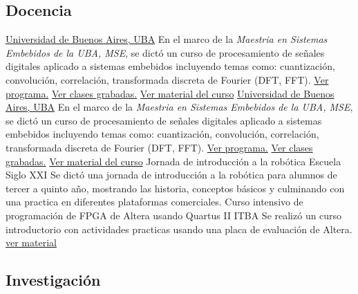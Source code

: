    \subsection{\bfseries{Docencia}}
                   {\href{\linkuba}{Universidad de Buenos Aires, UBA}} {}{}{En el marco de la \emph{Maestria en Sistemas Embebidos de la UBA, MSE}, se dictó un curso de procesamiento de señales digitales  aplicado a sistemas embebidos incluyendo temas como: cuantización, convolución, correlación, transformada discreta de Fourier (DFT, FFT). \href{\linkmse}{Ver programa.} \href{\linkmsepsftwentyonevideos}{Ver clases grabadas.} \href{\linkmsepsftwentyonematerial}{Ver material del curso}}
                                  {\href{\linkuba}{Universidad de Buenos Aires, UBA}} {}{}{En el marco de la \emph{Maestria en Sistemas Embebidos de la UBA, MSE}, se dictó un curso de procesamiento de señales digitales  aplicado a sistemas embebidos incluyendo temas como: cuantización, convolución, correlación, transformada discreta de Fourier (DFT, FFT). \href{\linkmse}{Ver programa.} \href{\linkmsepsfvideos}{Ver clases grabadas.} \href{\linkmsepsfmaterial}{Ver material del curso}}
       { Jornada de introducción a la robótica}                               { Escuela Siglo XXI} {} {} { Se dictó una jornada de introducción a la robótica para alumnos de tercer a quinto año, mostrando las historia, conceptos básicos y culminando con una practica en diferentes plataformas comerciales.}{}
       { Curso intensivo de programación de FPGA de Altera usando Quartus II} { ITBA}{} {} { Se realizó un curso introductorio con actividades practicas usando una placa de evaluación de Altera. \href { \linkfpgasig } { ver material}}
      \vfill{}

   \subsection{\bfseries{Investigación}}
      \vfill{}

